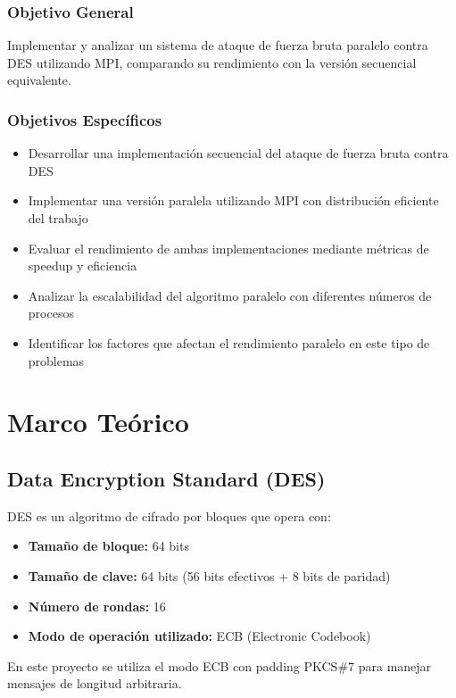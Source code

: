 \documentclass[12pt,letterpaper]{article}
\begin{document}
\subsubsection{Objetivo General}
Implementar y analizar un sistema de ataque de fuerza bruta paralelo contra DES utilizando MPI, comparando su rendimiento con la versión secuencial equivalente.

\subsubsection{Objetivos Específicos}
\begin{itemize}
    \item Desarrollar una implementación secuencial del ataque de fuerza bruta contra DES
    \item Implementar una versión paralela utilizando MPI con distribución eficiente del trabajo
    \item Evaluar el rendimiento de ambas implementaciones mediante métricas de speedup y eficiencia
    \item Analizar la escalabilidad del algoritmo paralelo con diferentes números de procesos
    \item Identificar los factores que afectan el rendimiento paralelo en este tipo de problemas
\end{itemize}

\section{Marco Teórico}

\subsection{Data Encryption Standard (DES)}

DES es un algoritmo de cifrado por bloques que opera con:
\begin{itemize}
    \item \textbf{Tamaño de bloque:} 64 bits
    \item \textbf{Tamaño de clave:} 64 bits (56 bits efectivos + 8 bits de paridad)
    \item \textbf{Número de rondas:} 16
    \item \textbf{Modo de operación utilizado:} ECB (Electronic Codebook)
\end{itemize}

En este proyecto se utiliza el modo ECB con padding PKCS\#7 para manejar mensajes de longitud arbitraria.
\end{document}
